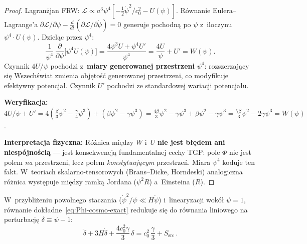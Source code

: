\begin{proof}
Lagran\.zjan FRW: $\mathcal{L} \propto a^3\psi^4[-\frac{1}{2}\dot\psi^2/c_0^2 - U(\psi)]$.
R\'ownanie Eulera--Lagrange'a $\partial\mathcal{L}/\partial\psi
- \frac{d}{dt}(\partial\mathcal{L}/\partial\dot\psi) = 0$
generuje pochodn\k{a} po $\psi$ z~iloczynu $\psi^4 \cdot U(\psi)$.
Dziel\k{a}c przez $\psi^4$:
\[
  \frac{1}{\psi^4}\,\frac{\partial}{\partial\psi}\bigl[\psi^4 U(\psi)\bigr]
  = \frac{4\psi^3 U + \psi^4 U'}{\psi^4}
  = \frac{4U}{\psi} + U'
  = W(\psi).
\]
Czynnik $4U/\psi$ pochodzi z~\textbf{miary generowanej przestrzeni} $\psi^4$:
rozszerzaj\k{a}cy si\k{e} Wszech\'swiat zmienia obj\k{e}to\'s\'c
generowanej przestrzeni, co modyfikuje efektywny potencja\l{}.
Czynnik $U'$ pochodzi ze standardowej wariacji potencja\l{}u.

\medskip\noindent\textbf{Weryfikacja:}
$4U/\psi + U' = 4(\tfrac{\beta}{3}\psi^2 - \tfrac{\gamma}{4}\psi^3)
+ (\beta\psi^2 - \gamma\psi^3)
= \tfrac{4\beta}{3}\psi^2 - \gamma\psi^3 + \beta\psi^2 - \gamma\psi^3
= \tfrac{7\beta}{3}\psi^2 - 2\gamma\psi^3 = W(\psi)$. \checkmark

\medskip\noindent\textbf{Interpretacja fizyczna:}
R\'o\.znica mi\k{e}dzy $W$ i~$U$ \textbf{nie jest b\l{}\k{e}dem ani
niesp\'ojno\'sci\k{a}} --- jest konsekwencj\k{a} fundamentalnej cechy TGP:
pole $\Phi$ nie jest polem \emph{na} przestrzeni, lecz polem
\emph{konstytuuj\k{a}cym} przestrze\'n. Miara $\psi^4$ koduje ten fakt.
W~teoriach skalarno-tensorowych (Brans--Dicke, Horndeski)
analogiczna r\'o\.znica wyst\k{e}puje mi\k{e}dzy ramk\k{a}
Jordana ($\psi^2 R$) a~Einsteina ($R$).
\end{proof}

\medskip
\begin{proposition}%
\label{prop:exact-to-linearized}
W~przybli\.zeniu powolnego staczania
($\dot\psi^2/\psi \ll H\dot\psi$) i~linearyzacji
wok\'o\l{} $\psi = 1$, r\'ownanie
dok\l{}adne~\eqref{eq:Phi-cosmo-exact} redukuje si\k{e} do
r\'ownania liniowego na perturbacj\k{e} $\delta \equiv \psi - 1$:
\begin{equation}\label{eq:Phi-cosmo-linearized}
  \boxed{
    \ddot\delta + 3H\dot\delta
    + \frac{4c_0^2\gamma}{3}\,\delta
    = c_0^2\,\frac{\gamma}{3}
    + S_{\mathrm{src}}\,.
  }
\end{equation}
\end{proposition}

